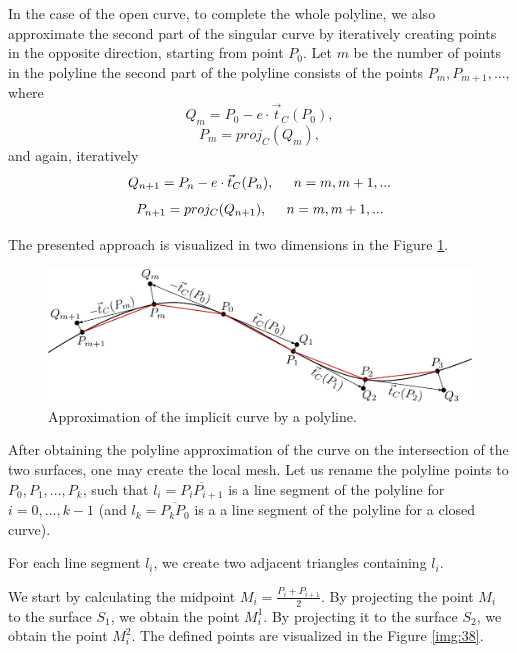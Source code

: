 In the case of the open curve, to complete the whole polyline, we also approximate 
the second part of the singular curve by iteratively creating points in the 
opposite direction, starting from point $P_0$. Let $m$ be the number of points
in the polyline the second part of the polyline consists of the points
$P_m, P_{m+1}, ...$, where
$$Q_m = P_0 - e \cdot \vec{t}_C(P_0),$$
$$P_m = proj_C(Q_m),$$
and again, iteratively
$$Q_{n+1} = P_n - e \cdot \vec{t}_C(P_{n}), \hspace{5mm} n = m, m+1, ...$$
$$P_{n+1} = proj_C(Q_{n+1}), \hspace{5mm} n = m, m+1, ...$$

The presented approach is visualized in two dimensions in the Figure \ref{img:37}.

\begin{figure}
    \centerline{\includegraphics[scale=0.5]{images/img37}}
    \caption[Approximation of the implicit curve by polyline]
    {Approximation of the implicit curve by a polyline.}
    \label{img:37}
\end{figure}

After obtaining the polyline approximation of the curve on the intersection
of the two surfaces, one may create the local mesh. Let us rename the polyline 
points to $P_0, P_1, ..., P_k$, such that $l_i = \overline{P_i P_{i+1}}$ is a 
line segment of the polyline for $i=0, ..., k-1$ (and $l_k = \overline{P_k P_0}$ is a 
a line segment of the polyline for a closed curve).

For each line segment $l_i$, we create two adjacent triangles containing $l_i$.

We start by calculating the midpoint $M_i = \frac{P_i+P_{i+1}}{2}$.
By projecting the point $M_i$ to the surface $S_1$, we obtain the point $M_i^1$.
By projecting it to the surface $S_2$, we obtain the point $M_i^2$. The defined points
are visualized in the Figure \ref{img:38}.

